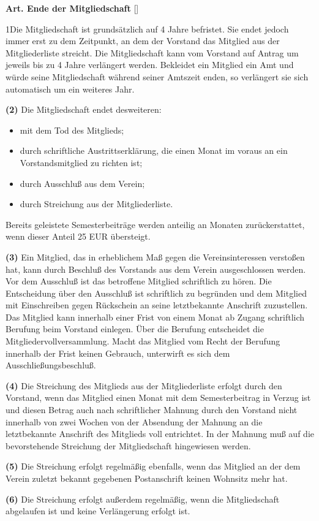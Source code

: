 \documentclass[12pt]{article}
\newcommand{\Satz}[2]{

\begin{samepage}
{\bf (#1)} #2
\end{samepage}
}
\newenvironment{Artikel}[2]{
\bigskip \centerline{{\bf Art. #1} [#2]}
\nopagebreak
}{
}
\begin{document}
\begin{Artikel}{10}{Ende der Mitgliedschaft}

\Satz{1}{Die Mitgliedschaft ist grundsätzlich auf 4 Jahre befristet.
  Sie endet jedoch immer erst zu dem Zeitpunkt, an dem der Vorstand das Mitglied aus der Mitgliederliste streicht.
  Die Mitgliedschaft kann vom Vorstand auf Antrag um jeweils bis zu 4 Jahre verlängert werden.
  Bekleidet ein Mitglied ein Amt und würde seine Mitgliedschaft während seiner Amtszeit enden, so verlängert sie sich automatisch um ein weiteres Jahr.}

\Satz{2}{Die Mitgliedschaft endet desweiteren:
\begin{itemize}
\item mit dem Tod des Mitglieds;
\item durch schriftliche Austrittserklärung, die einen Monat im voraus an ein Vorstandsmitglied zu richten ist;
\item durch Ausschluß aus dem Verein;
\item durch Streichung aus der Mitgliederliste.
\end{itemize}
Bereits geleistete Semesterbeiträge werden anteilig an Monaten zurückerstattet, wenn dieser Anteil 25 EUR übersteigt.}

\Satz{3}{Ein Mitglied, das in erheblichem Maß gegen die Vereinsinteressen verstoßen hat, kann durch Beschluß des Vorstands aus dem Verein ausgeschlossen werden.
  Vor dem Ausschluß ist das betroffene Mitglied schriftlich zu hören.
  Die Entscheidung über den Ausschluß ist schriftlich zu begründen und dem Mitglied mit Einschreiben gegen Rückschein an seine letztbekannte Anschrift zuzustellen.
  Das Mitglied kann innerhalb einer Frist von einem Monat ab Zugang schriftlich Berufung beim Vorstand einlegen.
  Über die Berufung entscheidet die Mitgliedervollversammlung.
  Macht das Mitglied vom Recht der Berufung innerhalb der Frist keinen Gebrauch, unterwirft es sich dem Ausschließungsbeschluß.}

\Satz{4}{Die Streichung des Mitglieds aus der Mitgliederliste erfolgt durch den Vorstand, wenn das Mitglied einen Monat mit dem Semesterbeitrag in Verzug ist und diesen Betrag auch nach schriftlicher Mahnung durch den Vorstand nicht innerhalb von zwei Wochen von der Absendung der Mahnung an die letztbekannte Anschrift des Mitglieds voll entrichtet.
  In der Mahnung muß auf die bevorstehende Streichung der Mitgliedschaft hingewiesen werden.}

\Satz{5}{Die Streichung erfolgt regelmäßig ebenfalls, wenn das Mitglied an der dem Verein zuletzt bekannt gegebenen Postanschrift keinen Wohnsitz mehr hat.}

\Satz{6}{Die Streichung erfolgt außerdem regelmäßig, wenn die Mitgliedschaft abgelaufen ist und keine Verlängerung erfolgt ist.}

\end{Artikel}
\end{document}
